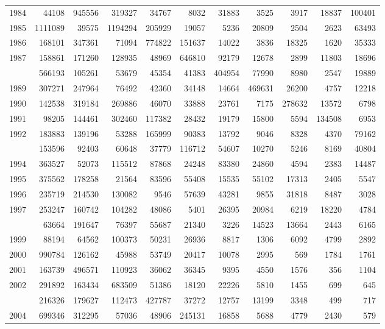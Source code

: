 \documentclass[
]{article}
\begin{document}
\begin{longtable}[t]{lrrrrrrrrrr}
1984 & 44108 & 945556 & 319327 & 34767 & 8032 & 31883 & 3525 & 3917 & 18837 & 100401\\
1985 & 1111089 & 39575 & 1194294 & 205929 & 19057 & 5236 & 20809 & 2504 & 2623 & 63493\\
1986 & 168101 & 347361 & 71094 & 774822 & 151637 & 14022 & 3836 & 18325 & 1620 & 35333\\
1987 & 158861 & 171260 & 128935 & 48969 & 646810 & 92179 & 12678 & 2899 & 11803 & 18696\\
\addlinespace
1988 & 566193 & 105261 & 53679 & 45354 & 41383 & 404954 & 77990 & 8980 & 2547 & 19889\\
1989 & 307271 & 247964 & 76492 & 42360 & 34148 & 14664 & 469631 & 26200 & 4757 & 12218\\
1990 & 142538 & 319184 & 269886 & 46070 & 33888 & 23761 & 7175 & 278632 & 13572 & 6798\\
1991 & 98205 & 144461 & 302460 & 117382 & 28432 & 19179 & 15800 & 5594 & 134508 & 6953\\
1992 & 183883 & 139196 & 53288 & 165999 & 90383 & 13792 & 9046 & 8328 & 4370 & 79162\\
\addlinespace
1993 & 153596 & 92403 & 60648 & 37779 & 116712 & 54607 & 10270 & 5246 & 8169 & 40804\\
1994 & 363527 & 52073 & 115512 & 87868 & 24248 & 83380 & 24860 & 4594 & 2383 & 14487\\
1995 & 375562 & 178258 & 21564 & 83596 & 55408 & 15535 & 55102 & 17313 & 2405 & 5547\\
1996 & 235719 & 214530 & 130082 & 9546 & 57639 & 43281 & 9855 & 31818 & 8487 & 3028\\
1997 & 253247 & 160742 & 104282 & 48086 & 5401 & 26395 & 20984 & 6219 & 18220 & 4784\\
\addlinespace
1998 & 63664 & 191647 & 76397 & 55687 & 21340 & 3226 & 14523 & 13664 & 2443 & 6165\\
1999 & 88194 & 64562 & 100373 & 50231 & 26936 & 8817 & 1306 & 6092 & 4799 & 2892\\
2000 & 990784 & 126162 & 45988 & 53749 & 20417 & 10078 & 2995 & 569 & 1784 & 1761\\
2001 & 163739 & 496571 & 110923 & 36062 & 36345 & 9395 & 4550 & 1576 & 356 & 1104\\
2002 & 291892 & 163434 & 683509 & 51386 & 18120 & 22226 & 5810 & 1455 & 699 & 645\\
\addlinespace
2003 & 216326 & 179627 & 112473 & 427787 & 37272 & 12757 & 13199 & 3348 & 499 & 717\\
2004 & 699346 & 312295 & 57036 & 48906 & 245131 & 16858 & 5688 & 4779 & 2430 & 579\\

\end{longtable}
\end{document}
